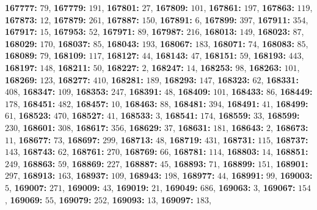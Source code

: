 \textsf{\bfseries 167777:} $79$, \textsf{\bfseries 167779:} $191$, \textsf{\bfseries 167801:} $27$, \textsf{\bfseries 167809:} $101$, \textsf{\bfseries 167861:} $197$, \textsf{\bfseries 167863:} $119$, \textsf{\bfseries 167873:} $12$, \textsf{\bfseries 167879:} $261$, \textsf{\bfseries 167887:} $150$, \textsf{\bfseries 167891:} $6$, \textsf{\bfseries 167899:} $397$, \textsf{\bfseries 167911:} $354$, \textsf{\bfseries 167917:} $15$, \textsf{\bfseries 167953:} $52$, \textsf{\bfseries 167971:} $89$, \textsf{\bfseries 167987:} $216$, \textsf{\bfseries 168013:} $149$, \textsf{\bfseries 168023:} $87$, \textsf{\bfseries 168029:} $170$, \textsf{\bfseries 168037:} $85$, \textsf{\bfseries 168043:} $193$, \textsf{\bfseries 168067:} $183$, \textsf{\bfseries 168071:} $74$, \textsf{\bfseries 168083:} $85$, \textsf{\bfseries 168089:} $79$, \textsf{\bfseries 168109:} $117$, \textsf{\bfseries 168127:} $44$, \textsf{\bfseries 168143:} $47$, \textsf{\bfseries 168151:} $59$, \textsf{\bfseries 168193:} $443$, \textsf{\bfseries 168197:} $148$, \textsf{\bfseries 168211:} $50$, \textsf{\bfseries 168227:} $2$, \textsf{\bfseries 168247:} $14$, \textsf{\bfseries 168253:} $98$, \textsf{\bfseries 168263:} $101$, \textsf{\bfseries 168269:} $123$, \textsf{\bfseries 168277:} $410$, \textsf{\bfseries 168281:} $189$, \textsf{\bfseries 168293:} $147$, \textsf{\bfseries 168323:} $62$, \textsf{\bfseries 168331:} $408$, \textsf{\bfseries 168347:} $109$, \textsf{\bfseries 168353:} $247$, \textsf{\bfseries 168391:} $48$, \textsf{\bfseries 168409:} $101$, \textsf{\bfseries 168433:} $86$, \textsf{\bfseries 168449:} $178$, \textsf{\bfseries 168451:} $482$, \textsf{\bfseries 168457:} $10$, \textsf{\bfseries 168463:} $88$, \textsf{\bfseries 168481:} $394$, \textsf{\bfseries 168491:} $41$, \textsf{\bfseries 168499:} $61$, \textsf{\bfseries 168523:} $470$, \textsf{\bfseries 168527:} $41$, \textsf{\bfseries 168533:} $3$, \textsf{\bfseries 168541:} $174$, \textsf{\bfseries 168559:} $33$, \textsf{\bfseries 168599:} $230$, \textsf{\bfseries 168601:} $308$, \textsf{\bfseries 168617:} $356$, \textsf{\bfseries 168629:} $37$, \textsf{\bfseries 168631:} $181$, \textsf{\bfseries 168643:} $2$, \textsf{\bfseries 168673:} $11$, \textsf{\bfseries 168677:} $73$, \textsf{\bfseries 168697:} $299$, \textsf{\bfseries 168713:} $48$, \textsf{\bfseries 168719:} $431$, \textsf{\bfseries 168731:} $115$, \textsf{\bfseries 168737:} $143$, \textsf{\bfseries 168743:} $62$, \textsf{\bfseries 168761:} $270$, \textsf{\bfseries 168769:} $66$, \textsf{\bfseries 168781:} $114$, \textsf{\bfseries 168803:} $14$, \textsf{\bfseries 168851:} $249$, \textsf{\bfseries 168863:} $59$, \textsf{\bfseries 168869:} $227$, \textsf{\bfseries 168887:} $45$, \textsf{\bfseries 168893:} $71$, \textsf{\bfseries 168899:} $151$, \textsf{\bfseries 168901:} $297$, \textsf{\bfseries 168913:} $163$, \textsf{\bfseries 168937:} $109$, \textsf{\bfseries 168943:} $198$, \textsf{\bfseries 168977:} $44$, \textsf{\bfseries 168991:} $99$, \textsf{\bfseries 169003:} $5$, \textsf{\bfseries 169007:} $271$, \textsf{\bfseries 169009:} $43$, \textsf{\bfseries 169019:} $21$, \textsf{\bfseries 169049:} $686$, \textsf{\bfseries 169063:} $3$, \textsf{\bfseries 169067:} $154$, \textsf{\bfseries 169069:} $55$, \textsf{\bfseries 169079:} $252$, \textsf{\bfseries 169093:} $13$, \textsf{\bfseries 169097:} $183$, 
